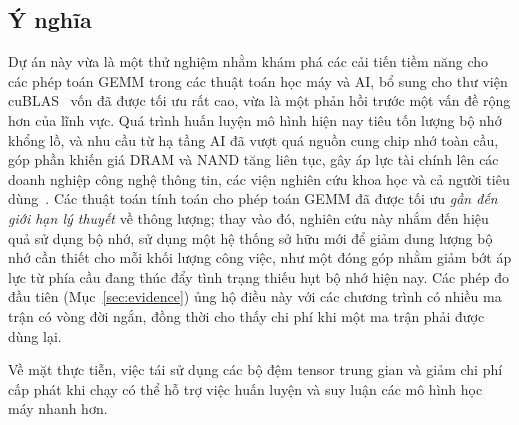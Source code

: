 \documentclass[a4paper]{article}
\begin{document}
	\subsection{Ý nghĩa}
	Dự án này vừa là một thử nghiệm nhằm khám phá các cải tiến tiềm năng cho các phép toán GEMM trong các thuật toán học máy và AI, bổ sung cho thư viện cuBLAS~\cite{cublas} vốn đã được tối ưu rất cao, vừa là một phản hồi trước một vấn đề rộng hơn của lĩnh vực. Quá trình huấn luyện mô hình hiện nay tiêu tốn lượng bộ nhớ khổng lồ, và nhu cầu từ hạ tầng AI đã vượt quá nguồn cung chip nhớ toàn cầu, góp phần khiến giá DRAM và NAND tăng liên tục, gây áp lực tài chính lên các doanh nghiệp công nghệ thông tin, các viện nghiên cứu khoa học và cả người tiêu dùng~\cite{DRAM_PRICE}.
	Các thuật toán tính toán cho phép toán GEMM đã được tối ưu \emph{gần đến giới hạn lý thuyết} về thông lượng; thay vào đó, nghiên cứu này nhắm đến hiệu quả sử dụng bộ nhớ, sử dụng một hệ thống sở hữu mới để giảm dung lượng bộ nhớ cần thiết cho mỗi khối lượng công việc, như một đóng góp nhằm giảm bớt áp lực từ phía cầu đang thúc đẩy tình trạng thiếu hụt bộ nhớ hiện nay. Các phép đo đầu tiên (Mục~\ref{sec:evidence}) ủng hộ điều này với các chương trình có nhiều ma trận có vòng đời ngắn, đồng thời cho thấy chi phí khi một ma trận phải được dùng lại.
	
	Về mặt thực tiễn, việc tái sử dụng các bộ đệm tensor trung gian và giảm chi phí cấp phát khi chạy có thể hỗ trợ việc huấn luyện và suy luận các mô hình học máy nhanh hơn.
	
\end{document}
